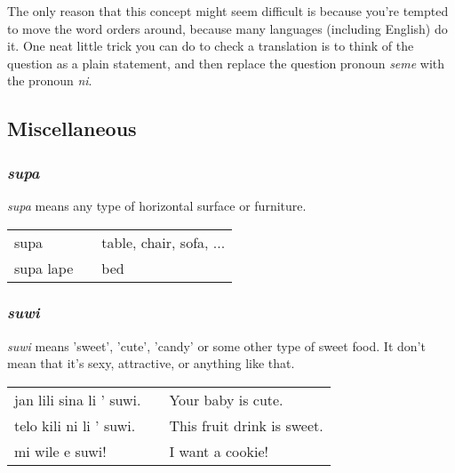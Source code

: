 The only reason that this concept might seem difficult is because you're tempted to move the word orders around, because many languages (including English) do it. 
One neat little trick you can do to check a translation is to think of the question as a plain statement, and then replace the question pronoun \textit{seme} with the pronoun \textit{ni}. 
%
%
\newpage
\subsection*{Miscellaneous}
%
\subsubsection*{\textit{supa}}
%
\textit{supa} means any type of horizontal surface or furniture. 

\begin{supertabular}{p{5,5cm}|ll}
supa  && table, chair, sofa, ...  \\
supa lape &&  bed \\
\end{supertabular} 

%
\subsubsection*{\textit{suwi}}
%
\textit{suwi} means 'sweet', 'cute', 'candy' or some other type of sweet food. 
It don't mean that it's sexy, attractive, or anything like that. 

\begin{supertabular}{p{5,5cm}|ll}
jan lili sina li ' suwi. && Your baby is cute. \\
telo kili ni li ' suwi. && This fruit drink is sweet. \\
mi wile e suwi! && I want a cookie! \\
\end{supertabular} 

